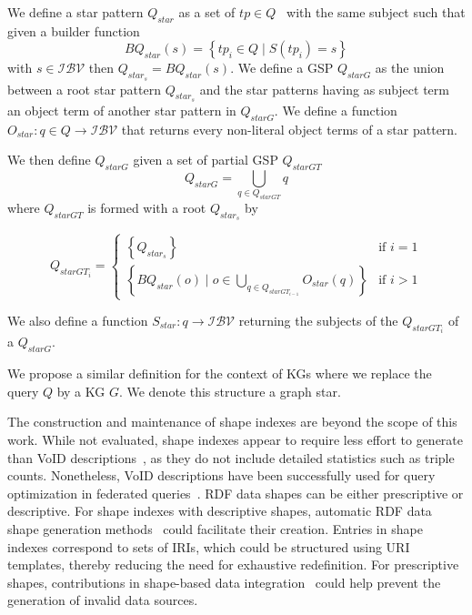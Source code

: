 \begin{definition}\label{def:starPattern}
   We define a star pattern $Q_{star}$ as a set of $tp \in Q$~\cite{Karim2020} with the same subject such that 
   given a builder function 
   \begin{equation}
       BQ_{star}(s) = \left\{ tp_i \in Q \mid S(tp_i) = s \right\}
   \end{equation}
   with $s \in \mathcal{I}\mathcal{B}\mathcal{V}$ then $Q_{star_s} = BQ_{star}(s)$.
   We define a GSP $Q_{starG}$ as the union between a root star pattern $Q_{star_s}$
   and the star patterns having as subject term an object term of another star pattern in $Q_{starG}$.
   We define a function 
   $O_{star}: q \in Q \rightarrow  \mathcal{I}\mathcal{B}\mathcal{V}$
   that returns every non-literal object terms of a star pattern.

   We then define $Q_{starG}$ given a  set of partial GSP $Q_{starGT}$
   \begin{equation}
      Q_{starG} = \bigcup_{q \in Q_{starGT}} q
   \end{equation}
   where $Q_{starGT}$ is formed with a root $Q_{star_s}$ by

   \begin{equation}
           Q_{starGT_i} =
       \begin{cases}
         \left\{ Q_{star_s} \right\} & \text{if } i = 1 \\
           \left\{ BQ_{star}(o) \mid o \in \bigcup_{q \in Q_{starGT_{i-1}}} O_{star}(q) \right\} & \text{if } i>1
       \end{cases}
   \end{equation}

   We also define a function  
   $S_{star}: q \rightarrow  \mathcal{I}\mathcal{B}\mathcal{V}$
   returning the subjects of the $Q_{starGT_i}$ of a $Q_{starG}$.

   We propose a similar definition for the context of KGs where we replace the query $Q$ by a KG $G$. 
   We denote this structure a graph star.
   
\end{definition}

The construction and maintenance of shape indexes are beyond the scope of this work.
While not evaluated, shape indexes appear to require less effort to generate than VoID descriptions~\cite{Boehm2011}, as they do not include detailed statistics such as triple counts.
Nonetheless, VoID descriptions have been successfully used for query optimization in federated queries~\cite{Montoya2017}.
RDF data shapes can be either prescriptive or descriptive.
For shape indexes with descriptive shapes, automatic RDF data shape generation methods~\cite{fernandez2023extracting} could facilitate their creation.
Entries in shape indexes correspond to sets of IRIs, which could be structured using URI templates, thereby reducing the need for exhaustive redefinition.
For prescriptive shapes, contributions in shape-based data integration~\cite{LabraGayo2023} could help prevent the generation of invalid data sources.


